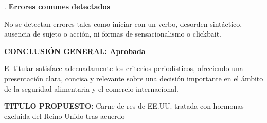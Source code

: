 \documentclass[10pt,a4paper]{article}
\begin{document}
\par{}. \textbf{Errores comunes detectados}
\par\medskip
   No se detectan errores tales como iniciar con un verbo, desorden sint\'{a}ctico, ausencia de sujeto o acci\'{o}n, ni formas de sensacionalismo o clickbait.
\par\medskip
\textbf{CONCLUSI\'{O}N GENERAL: Aprobada}
\par\medskip
El titular satisface adecuadamente los criterios period\'{i}sticos, ofreciendo una presentaci\'{o}n clara, concisa y relevante sobre una decisi\'{o}n importante en el \'{a}mbito de la seguridad alimentaria y el comercio internacional.
\par\medskip
\textbf{TITULO PROPUESTO:} Carne de res de EE.UU. tratada con hormonas excluida del Reino Unido tras acuerdo
        \vspace{1em}
\vspace{1em}

\end{document}
